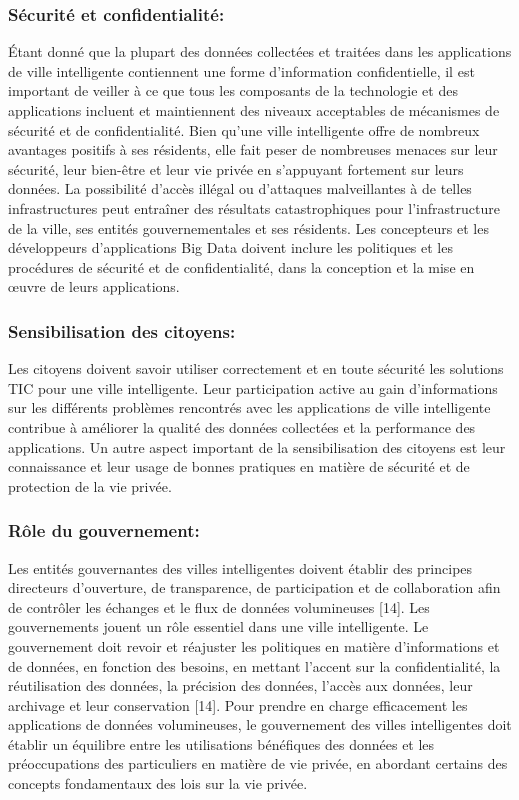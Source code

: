 \documentclass[french, a4paper, 12pt]{report}
\begin{document}
\subsubsection{Sécurité et confidentialité:}
Étant donné que la plupart des données collectées et traitées dans les applications de ville intelligente contiennent une forme d’information confidentielle, il est important de veiller à ce que tous les composants de la technologie et des applications incluent et maintiennent des niveaux acceptables de mécanismes de sécurité et de confidentialité. Bien qu'une ville intelligente offre de nombreux avantages positifs à ses résidents, elle fait peser de nombreuses menaces sur leur sécurité, leur bien-être et leur vie privée en s'appuyant fortement sur leurs données. La possibilité d'accès illégal ou d'attaques malveillantes à de telles infrastructures peut entraîner des résultats catastrophiques pour l'infrastructure de la ville, ses entités gouvernementales et ses résidents. Les concepteurs et les développeurs d’applications Big Data doivent inclure les politiques et les procédures de sécurité et de confidentialité, dans la conception et la mise en œuvre de leurs applications. \\
\subsubsection{Sensibilisation des citoyens:}
Les citoyens doivent savoir utiliser correctement et en toute sécurité les solutions TIC pour une ville intelligente. Leur participation active au gain d'informations sur les différents problèmes rencontrés avec les applications de ville intelligente contribue à améliorer la qualité des données collectées et la performance des applications. Un autre aspect important de la sensibilisation des citoyens est leur connaissance et leur usage de bonnes pratiques en matière de sécurité et de protection de la vie privée. \\
\subsubsection{Rôle du gouvernement:}
Les entités gouvernantes des villes intelligentes doivent établir des principes directeurs d'ouverture, de transparence, de participation et de collaboration afin de contrôler les échanges et le flux de données volumineuses [14]. Les gouvernements jouent un rôle essentiel dans une ville intelligente. Le gouvernement doit revoir et réajuster les politiques en matière d'informations et de données, en fonction des besoins, en mettant l'accent sur la confidentialité, la réutilisation des données, la précision des données, l'accès aux données, leur archivage et leur conservation [14]. 
Pour prendre en charge efficacement les applications de données volumineuses, le gouvernement des villes intelligentes doit établir un équilibre entre les utilisations bénéfiques des données et les préoccupations des particuliers en matière de vie privée, en abordant certains des concepts fondamentaux des lois sur la vie privée.\\
\end{document}
